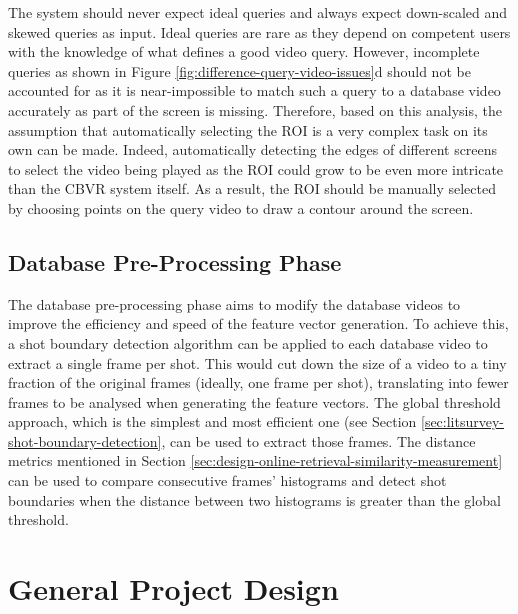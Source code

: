 The system should never expect ideal queries and always expect down-scaled and skewed queries as input. Ideal queries are rare as they depend on competent users with the knowledge of what defines a good video query. However, incomplete queries as shown in Figure \ref{fig:difference-query-video-issues}d should not be accounted for as it is near-impossible to match such a query to a database video accurately as part of the screen is missing. Therefore, based on this analysis, the assumption that automatically selecting the ROI is a very complex task on its own can be made. Indeed, automatically detecting the edges of different screens to select the video being played as the ROI could grow to be even more intricate than the CBVR system itself. As a result, the ROI should be manually selected by choosing points on the query video to draw a contour around the screen. 


\subsection{Database Pre-Processing Phase}

The database pre-processing phase aims to modify the database videos to improve the efficiency and speed of the feature vector generation. To achieve this, a shot boundary detection algorithm can be applied to each database video to extract a single frame per shot. This would cut down the size of a video to a tiny fraction of the original frames (ideally, one frame per shot), translating into fewer frames to be analysed when generating the feature vectors. The global threshold approach, which is the simplest and most efficient one (see Section \ref{sec:litsurvey-shot-boundary-detection}, can be used to extract those frames. The distance metrics mentioned in Section \ref{sec:design-online-retrieval-similarity-measurement} can be used to compare consecutive frames' histograms and detect shot boundaries when the distance between two histograms is greater than the global threshold.


\section{General Project Design}

